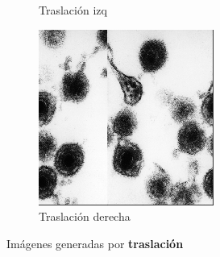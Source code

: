 \documentclass{uc3mpracticas}
\begin{document}
\begin{figure}[!h]
\begin{subfigure}[b]{0.18\textwidth}
      \caption{Traslación izq}
    \end{subfigure}
    \hfill
    \begin{subfigure}[b]{0.18\textwidth}
      \includegraphics[width=\textwidth, frame]{Images/trasDrch.png}
      \caption{Traslación derecha}
    \end{subfigure}

    \caption{Imágenes generadas por \textbf{traslación}}
  \end{figure}
\end{document}
